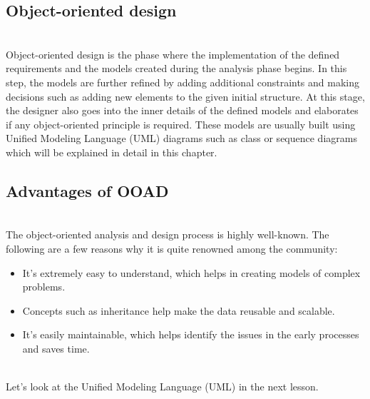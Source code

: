 \subsection{Object-oriented design}\label{2urde7A2qREP835oC2yU_}
\\
Object-oriented design is the phase where the implementation of the defined requirements and the models created during the analysis phase begins. In this step, the models are further refined by adding additional constraints and making decisions such as adding new elements to the given initial structure. At this stage, the designer also goes into the inner details of the defined models and elaborates if any object-oriented principle is required. These models are usually built using Unified Modeling Language (UML) diagrams such as class or sequence diagrams which will be explained in detail in this chapter.

\subsection{Advantages of OOAD}\label{wu__3ToJNcNkZC9D9pvOS}
\\
The object-oriented analysis and design process is highly well-known. The following are a few reasons why it is quite renowned among the community:

\begin{itemize}
\item
\protect{}\label{uKb8-15dgGBYj1Jjtz0mY}
It's extremely easy to understand, which helps in creating models of complex problems.
\item
\protect{}\label{uinFTVPUVApS7b595BZBN}
Concepts such as inheritance help make the data reusable and scalable.
\item
\protect{}\label{FrA0CX46aIqg0dda9Mlkt}
It's easily maintainable, which helps identify the issues in the early processes and saves time.
\end{itemize}
\\
Let's look at the Unified Modeling Language (UML) in the next lesson.

